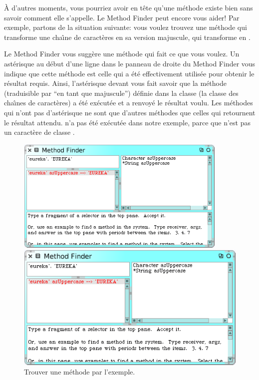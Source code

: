 \documentclass[a4paper,10pt,twoside]{book}
\begin{document}
\`A d'autres moments, vous pourriez avoir en t\^ete qu'une m\'ethode
existe bien sans savoir comment elle s'appelle.
Le Method Finder peut encore vous aider! Par exemple, partons de la
situation suivante: vous voulez trouvez une m\'ethode qui transforme
une cha\^{\i}ne de caract\`eres en sa version majuscule, \cad qui
transforme  en .

\noindent
Le Method Finder vous sugg\`ere une m\'ethode qui fait ce
que vous voulez.
Un ast\'erisque au d\'ebut d'une ligne dans le panneau de droite du
Method Finder vous indique que cette m\'ethode est celle qui a \'et\'e
effectivement utilis\'ee pour obtenir le r\'esultat requis.
Ainsi, l'ast\'erisque devant  vous fait savoir
que la m\'ethode  
(traduisible par ``en tant que majuscule'')
d\'efinie dans la classe  
(la classe des cha\^{\i}nes de caract\`eres)
a \'et\'e ex\'ecut\'ee et a renvoy\'e le r\'esultat voulu.
Les m\'ethodes qui n'ont pas d'ast\'erisque ne sont que d'autres
m\'ethodes que celles qui retournent le r\'esultat attendu.
 n'a pas \'et\'e ex\'ecut\'ee dans notre
exemple, parce que  n'est pas un caract\`ere de classe .

\begin{figure}[hbt]
\ifluluelse
	{\centerline {\includegraphics[width=0.9\textwidth]{MethodFinder-example1}}}
	{\centerline {\includegraphics[scale=0.7]{MethodFinder-example1}}}
\caption{Trouver une méthode par l'exemple.
\label{fig:methodFinder-example1}}
\end{figure}
\end{document}
